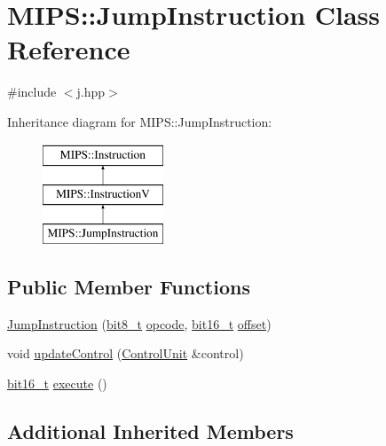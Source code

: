 \hypertarget{classMIPS_1_1JumpInstruction}{}\section{M\+I\+PS\+:\+:Jump\+Instruction Class Reference}
\label{classMIPS_1_1JumpInstruction}


{\ttfamily \#include $<$j.\+hpp$>$}

Inheritance diagram for M\+I\+PS\+:\+:Jump\+Instruction\+:\begin{figure}[H]
\begin{center}
\leavevmode
\includegraphics[height=3.000000cm]{classMIPS_1_1JumpInstruction}
\end{center}
\end{figure}
\subsection*{Public Member Functions}
\begin{DoxyCompactItemize}
\item 
\hyperlink{classMIPS_1_1JumpInstruction_a5688d5a7c2ded2c3b8a32cb395cb9db9}{Jump\+Instruction} (\hyperlink{core_8hpp_a6074bae122ae7b527864eec42c728c3c}{bit8\+\_\+t} \hyperlink{classMIPS_1_1Instruction_a45cc6808b5dde8a5d41067d148b55476}{opcode}, \hyperlink{core_8hpp_adc265a970bc35995b5879784bbb3f1b7}{bit16\+\_\+t} \hyperlink{classMIPS_1_1InstructionV_ac2e294fde4971aa6a149480f22ae29e9}{offset})
\item 
void \hyperlink{classMIPS_1_1JumpInstruction_a1599bb129ba72825caf547ffa3a46421}{update\+Control} (\hyperlink{classMIPS_1_1ControlUnit}{Control\+Unit} \&control)
\item 
\hyperlink{core_8hpp_adc265a970bc35995b5879784bbb3f1b7}{bit16\+\_\+t} \hyperlink{classMIPS_1_1JumpInstruction_a843961af93d20e35dd1fab6bf341e16e}{execute} ()
\end{DoxyCompactItemize}
\subsection*{Additional Inherited Members}


